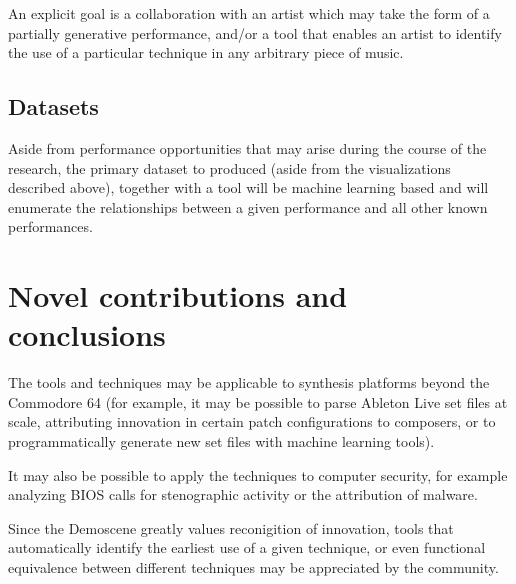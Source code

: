 \documentclass[10pt]{article}
\begin{document}
\begin{multicols*}{2}
  An explicit goal is a collaboration with an artist which may take
  the form of a partially generative performance, and/or a tool that
  enables an artist to identify the use of a particular technique in any
  arbitrary piece of music.

  \subsection{Datasets}
  Aside from performance opportunities that may arise during the
  course of the research, the primary dataset to produced (aside from
  the visualizations described above), together with a tool will
  be machine learning based and will enumerate the relationships
  between a given performance and all other known performances.

\section{Novel contributions and conclusions}

The tools and techniques may be applicable to synthesis platforms
beyond the Commodore 64 (for example, it may be possible to parse
Ableton Live set files at scale, attributing innovation in certain
patch configurations to composers, or to programmatically generate new
set files with machine learning tools).

It may also be possible to apply the techniques to computer
security, for example analyzing BIOS calls for stenographic
activity or the attribution of malware.

Since the Demoscene greatly values reconigition of innovation, tools
that automatically identify the earliest use of a given technique,
or even functional equivalence between different techniques may
be appreciated by the community.






\end{multicols*}
\end{document}

